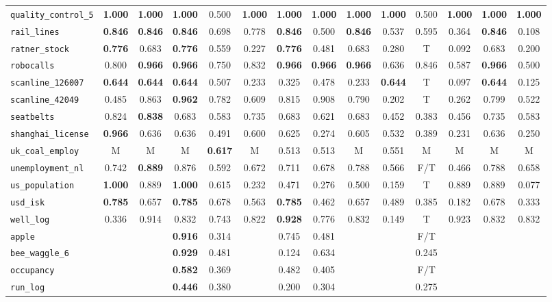 \begin{tabular}{lccccccccccccc}
\verb+quality_control_5+ & \textbf{1.000} & \textbf{1.000} & \textbf{1.000} & 0.500 & \textbf{1.000} & \textbf{1.000} & \textbf{1.000} & \textbf{1.000} & \textbf{1.000} & 0.500 & \textbf{1.000} & \textbf{1.000} & \textbf{1.000}\\
\verb+rail_lines+ & \textbf{0.846} & \textbf{0.846} & \textbf{0.846} & 0.698 & 0.778 & \textbf{0.846} & 0.500 & \textbf{0.846} & 0.537 & 0.595 & 0.364 & \textbf{0.846} & 0.108\\
\verb+ratner_stock+ & \textbf{0.776} & 0.683 & \textbf{0.776} & 0.559 & 0.227 & \textbf{0.776} & 0.481 & 0.683 & 0.280 & T & 0.092 & 0.683 & 0.200\\
\verb+robocalls+ & 0.800 & \textbf{0.966} & \textbf{0.966} & 0.750 & 0.832 & \textbf{0.966} & \textbf{0.966} & \textbf{0.966} & 0.636 & 0.846 & 0.587 & \textbf{0.966} & 0.500\\
\verb+scanline_126007+ & \textbf{0.644} & \textbf{0.644} & \textbf{0.644} & 0.507 & 0.233 & 0.325 & 0.478 & 0.233 & \textbf{0.644} & T & 0.097 & \textbf{0.644} & 0.125\\
\verb+scanline_42049+ & 0.485 & 0.863 & \textbf{0.962} & 0.782 & 0.609 & 0.815 & 0.908 & 0.790 & 0.202 & T & 0.262 & 0.799 & 0.522\\
\verb+seatbelts+ & 0.824 & \textbf{0.838} & 0.683 & 0.583 & 0.735 & 0.683 & 0.621 & 0.683 & 0.452 & 0.383 & 0.456 & 0.735 & 0.583\\
\verb+shanghai_license+ & \textbf{0.966} & 0.636 & 0.636 & 0.491 & 0.600 & 0.625 & 0.274 & 0.605 & 0.532 & 0.389 & 0.231 & 0.636 & 0.250\\
\verb+uk_coal_employ+ & M & M & M & \textbf{0.617} & M & 0.513 & 0.513 & M & 0.551 & M & M & M & M\\
\verb+unemployment_nl+ & 0.742 & \textbf{0.889} & 0.876 & 0.592 & 0.672 & 0.711 & 0.678 & 0.788 & 0.566 & F/T & 0.466 & 0.788 & 0.658\\
\verb+us_population+ & \textbf{1.000} & 0.889 & \textbf{1.000} & 0.615 & 0.232 & 0.471 & 0.276 & 0.500 & 0.159 & T & 0.889 & 0.889 & 0.077\\
\verb+usd_isk+ & \textbf{0.785} & 0.657 & \textbf{0.785} & 0.678 & 0.563 & \textbf{0.785} & 0.462 & 0.657 & 0.489 & 0.385 & 0.182 & 0.678 & 0.333\\
\verb+well_log+ & 0.336 & 0.914 & 0.832 & 0.743 & 0.822 & \textbf{0.928} & 0.776 & 0.832 & 0.149 & T & 0.923 & 0.832 & 0.832\\
\hline
\verb+apple+ &  &  & \textbf{0.916} & 0.314 &  & 0.745 & 0.481 &  &  & F/T &  &  & \\
\verb+bee_waggle_6+ &  &  & \textbf{0.929} & 0.481 &  & 0.124 & 0.634 &  &  & 0.245 &  &  & \\
\verb+occupancy+ &  &  & \textbf{0.582} & 0.369 &  & 0.482 & 0.405 &  &  & F/T &  &  & \\
\verb+run_log+ &  &  & \textbf{0.446} & 0.380 &  & 0.200 & 0.304 &  &  & 0.275 &  &  & \\
\hline
\end{tabular}
